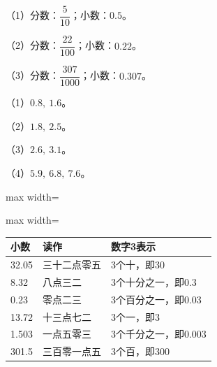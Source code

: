 
\begingroup\color{answerred}\noindent（1）分数：$\dfrac5{10}$；小数：$0.5$。\par
\noindent（2）分数：$\dfrac{22}{100}$；小数：$0.22$。\par
\noindent（3）分数：$\dfrac{307}{1000}$；小数：$0.307$。\par\par\endgroup
{}
\begingroup\color{answerred}\noindent（1）$0.8,\ 1.6$。\par
\noindent（2）$1.8,\ 2.5$。\par
\noindent（3）$2.6,\ 3.1$。\par
\noindent（4）$5.9,\ 6.8,\ 7.6$。\par\par\endgroup
{}
\begingroup\color{answerred}\par\smallskip\noindent\begin{adjustbox}{max width=\linewidth}\begin{adjustbox}{max width=\linewidth}\begin{tabular}{lll}\toprule 小数&读作&数字3表示\\\midrule 32.05&三十二点零五&3个十，即30\\8.32&八点三二&3个十分之一，即0.3\\0.23&零点二三&3个百分之一，即0.03\\13.72&十三点七二&3个一，即3\\1.503&一点五零三&3个千分之一，即0.003\\301.5&三百零一点五&3个百，即300\\\bottomrule\end{tabular}\end{adjustbox}\end{adjustbox}\par\smallskip\par\endgroup
